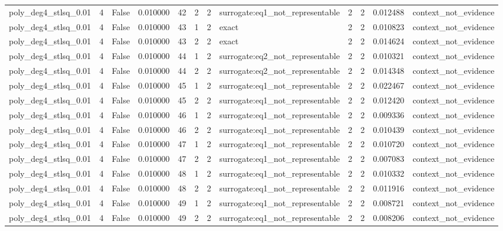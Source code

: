 \begin{tabular}{lrrrrrrlrrrl}
poly\_deg4\_stlsq\_0.01 & 4 & False & 0.010000 & 42 & 2 & 2 & surrogate:eq1\_not\_representable & 2 & 2 & 0.012488 & context\_not\_evidence \\
poly\_deg4\_stlsq\_0.01 & 4 & False & 0.010000 & 43 & 1 & 2 & exact & 2 & 2 & 0.010823 & context\_not\_evidence \\
poly\_deg4\_stlsq\_0.01 & 4 & False & 0.010000 & 43 & 2 & 2 & exact & 2 & 2 & 0.014624 & context\_not\_evidence \\
poly\_deg4\_stlsq\_0.01 & 4 & False & 0.010000 & 44 & 1 & 2 & surrogate:eq2\_not\_representable & 2 & 2 & 0.010321 & context\_not\_evidence \\
poly\_deg4\_stlsq\_0.01 & 4 & False & 0.010000 & 44 & 2 & 2 & surrogate:eq2\_not\_representable & 2 & 2 & 0.014348 & context\_not\_evidence \\
poly\_deg4\_stlsq\_0.01 & 4 & False & 0.010000 & 45 & 1 & 2 & surrogate:eq1\_not\_representable & 2 & 2 & 0.022467 & context\_not\_evidence \\
poly\_deg4\_stlsq\_0.01 & 4 & False & 0.010000 & 45 & 2 & 2 & surrogate:eq1\_not\_representable & 2 & 2 & 0.012420 & context\_not\_evidence \\
poly\_deg4\_stlsq\_0.01 & 4 & False & 0.010000 & 46 & 1 & 2 & surrogate:eq1\_not\_representable & 2 & 2 & 0.009336 & context\_not\_evidence \\
poly\_deg4\_stlsq\_0.01 & 4 & False & 0.010000 & 46 & 2 & 2 & surrogate:eq1\_not\_representable & 2 & 2 & 0.010439 & context\_not\_evidence \\
poly\_deg4\_stlsq\_0.01 & 4 & False & 0.010000 & 47 & 1 & 2 & surrogate:eq1\_not\_representable & 2 & 2 & 0.010720 & context\_not\_evidence \\
poly\_deg4\_stlsq\_0.01 & 4 & False & 0.010000 & 47 & 2 & 2 & surrogate:eq1\_not\_representable & 2 & 2 & 0.007083 & context\_not\_evidence \\
poly\_deg4\_stlsq\_0.01 & 4 & False & 0.010000 & 48 & 1 & 2 & surrogate:eq1\_not\_representable & 2 & 2 & 0.010332 & context\_not\_evidence \\
poly\_deg4\_stlsq\_0.01 & 4 & False & 0.010000 & 48 & 2 & 2 & surrogate:eq1\_not\_representable & 2 & 2 & 0.011916 & context\_not\_evidence \\
poly\_deg4\_stlsq\_0.01 & 4 & False & 0.010000 & 49 & 1 & 2 & surrogate:eq1\_not\_representable & 2 & 2 & 0.008721 & context\_not\_evidence \\
poly\_deg4\_stlsq\_0.01 & 4 & False & 0.010000 & 49 & 2 & 2 & surrogate:eq1\_not\_representable & 2 & 2 & 0.008206 & context\_not\_evidence \\

\end{tabular}
